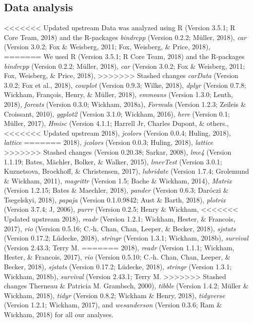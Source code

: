 \documentclass[man, fleqn, noextraspace]{apa6}
\theoremstyle{definition}
\theoremstyle{definition}
\theoremstyle{definition}
\theoremstyle{remark}
\begin{document}
\subsection{Data analysis}\label{data-analysis}

<<<<<<< Updated upstream
Data was analyzed using R (Version 3.5.1; R Core Team, 2018) and the
R-packages \emph{bindrcpp} (Version 0.2.2; Müller, 2018), \emph{car}
(Version 3.0.2; Fox \& Weisberg, 2011; Fox, Weisberg, \& Price, 2018),
=======
We used R (Version 3.5.1; R Core Team, 2018) and the R-packages
\emph{bindrcpp} (Version 0.2.2; Müller, 2018), \emph{car} (Version
3.0.2; Fox \& Weisberg, 2011; Fox, Weisberg, \& Price, 2018),
>>>>>>> Stashed changes
\emph{carData} (Version 3.0.2; Fox et al., 2018), \emph{cowplot}
(Version 0.9.3; Wilke, 2018), \emph{dplyr} (Version 0.7.8; Wickham,
François, Henry, \& Müller, 2018), \emph{emmeans} (Version 1.3.0; Lenth,
2018), \emph{forcats} (Version 0.3.0; Wickham, 2018a), \emph{Formula}
(Version 1.2.3; Zeileis \& Croissant, 2010), \emph{ggplot2} (Version
3.1.0; Wickham, 2016), \emph{here} (Version 0.1; Müller, 2017),
\emph{Hmisc} (Version 4.1.1; Harrell Jr, Charles Dupont, \& others.,
<<<<<<< Updated upstream
2018), \emph{jcolors} (Version 0.0.4; Huling, 2018), \emph{lattice}
=======
2018), \emph{jcolors} (Version 0.0.3; Huling, 2018), \emph{lattice}
>>>>>>> Stashed changes
(Version 0.20.38; Sarkar, 2008), \emph{lme4} (Version 1.1.19; Bates,
Mächler, Bolker, \& Walker, 2015), \emph{lmerTest} (Version 3.0.1;
Kuznetsova, Brockhoff, \& Christensen, 2017), \emph{lubridate} (Version
1.7.4; Grolemund \& Wickham, 2011), \emph{magrittr} (Version 1.5; Bache
\& Wickham, 2014), \emph{Matrix} (Version 1.2.15; Bates \& Maechler,
2018), \emph{pander} (Version 0.6.3; Daróczi \& Tsegelskyi, 2018),
\emph{papaja} (Version 0.1.0.9842; Aust \& Barth, 2018), \emph{plotrix}
(Version 3.7.4; J, 2006), \emph{purrr} (Version 0.2.5; Henry \& Wickham,
<<<<<<< Updated upstream
2018), \emph{readr} (Version 1.2.1; Wickham, Hester, \& Francois, 2017),
\emph{rio} (Version 0.5.16; C.-h. Chan, Chan, Leeper, \& Becker, 2018),
\emph{sjstats} (Version 0.17.2; Lüdecke, 2018), \emph{stringr} (Version
1.3.1; Wickham, 2018b), \emph{survival} (Version 2.43.3; Terry M.
=======
2018), \emph{readr} (Version 1.1.1; Wickham, Hester, \& Francois, 2017),
\emph{rio} (Version 0.5.10; C.-h. Chan, Chan, Leeper, \& Becker, 2018),
\emph{sjstats} (Version 0.17.2; Lüdecke, 2018), \emph{stringr} (Version
1.3.1; Wickham, 2018b), \emph{survival} (Version 2.43.1; Terry M.
>>>>>>> Stashed changes
Therneau \& Patricia M. Grambsch, 2000), \emph{tibble} (Version 1.4.2;
Müller \& Wickham, 2018), \emph{tidyr} (Version 0.8.2; Wickham \& Henry,
2018), \emph{tidyverse} (Version 1.2.1; Wickham, 2017), and
\emph{wesanderson} (Version 0.3.6; Ram \& Wickham, 2018) for all our
analyses.
\end{document}
